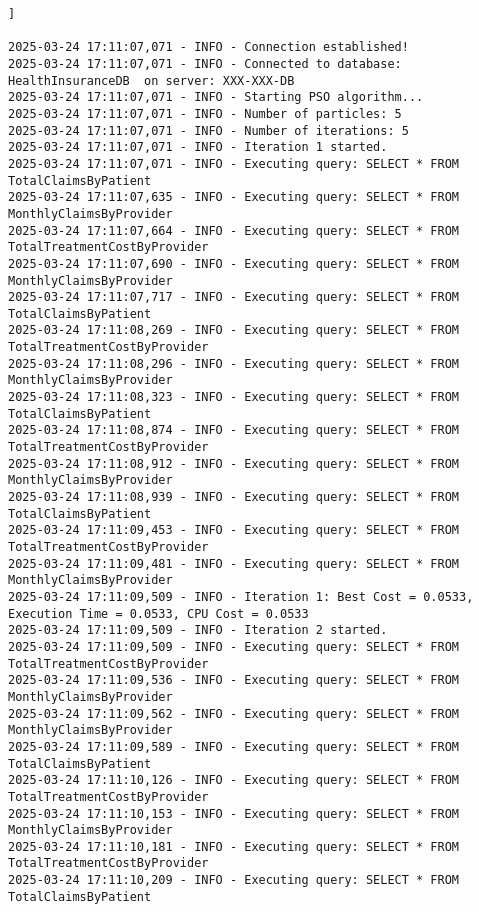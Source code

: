 \begin{lstlisting}[style=pythonstyle, caption={Output from python code }, label={lst:pso_fullOutput}]]

2025-03-24 17:11:07,071 - INFO - Connection established!
2025-03-24 17:11:07,071 - INFO - Connected to database: HealthInsuranceDB  on server: XXX-XXX-DB
2025-03-24 17:11:07,071 - INFO - Starting PSO algorithm...
2025-03-24 17:11:07,071 - INFO - Number of particles: 5
2025-03-24 17:11:07,071 - INFO - Number of iterations: 5
2025-03-24 17:11:07,071 - INFO - Iteration 1 started.
2025-03-24 17:11:07,071 - INFO - Executing query: SELECT * FROM TotalClaimsByPatient 
2025-03-24 17:11:07,635 - INFO - Executing query: SELECT * FROM MonthlyClaimsByProvider 
2025-03-24 17:11:07,664 - INFO - Executing query: SELECT * FROM TotalTreatmentCostByProvider 
2025-03-24 17:11:07,690 - INFO - Executing query: SELECT * FROM MonthlyClaimsByProvider 
2025-03-24 17:11:07,717 - INFO - Executing query: SELECT * FROM TotalClaimsByPatient 
2025-03-24 17:11:08,269 - INFO - Executing query: SELECT * FROM TotalTreatmentCostByProvider 
2025-03-24 17:11:08,296 - INFO - Executing query: SELECT * FROM MonthlyClaimsByProvider 
2025-03-24 17:11:08,323 - INFO - Executing query: SELECT * FROM TotalClaimsByPatient 
2025-03-24 17:11:08,874 - INFO - Executing query: SELECT * FROM TotalTreatmentCostByProvider 
2025-03-24 17:11:08,912 - INFO - Executing query: SELECT * FROM MonthlyClaimsByProvider 
2025-03-24 17:11:08,939 - INFO - Executing query: SELECT * FROM TotalClaimsByPatient 
2025-03-24 17:11:09,453 - INFO - Executing query: SELECT * FROM TotalTreatmentCostByProvider 
2025-03-24 17:11:09,481 - INFO - Executing query: SELECT * FROM MonthlyClaimsByProvider 
2025-03-24 17:11:09,509 - INFO - Iteration 1: Best Cost = 0.0533, Execution Time = 0.0533, CPU Cost = 0.0533
2025-03-24 17:11:09,509 - INFO - Iteration 2 started.
2025-03-24 17:11:09,509 - INFO - Executing query: SELECT * FROM TotalTreatmentCostByProvider 
2025-03-24 17:11:09,536 - INFO - Executing query: SELECT * FROM MonthlyClaimsByProvider 
2025-03-24 17:11:09,562 - INFO - Executing query: SELECT * FROM MonthlyClaimsByProvider 
2025-03-24 17:11:09,589 - INFO - Executing query: SELECT * FROM TotalClaimsByPatient 
2025-03-24 17:11:10,126 - INFO - Executing query: SELECT * FROM TotalTreatmentCostByProvider 
2025-03-24 17:11:10,153 - INFO - Executing query: SELECT * FROM MonthlyClaimsByProvider 
2025-03-24 17:11:10,181 - INFO - Executing query: SELECT * FROM TotalTreatmentCostByProvider 
2025-03-24 17:11:10,209 - INFO - Executing query: SELECT * FROM TotalClaimsByPatient 

\end{lstlisting}
